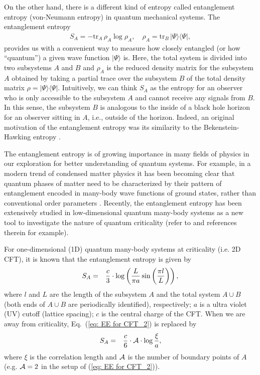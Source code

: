 \documentclass[twocolumn,amsmath,amssymb,nofootinbib,eqsecnum,tighten,prd]{revtex4}
\def\frac#1#2{{#1\over #2}}
\def\f {\frac}
\def\frac#1#2{{#1\over #2}}
\begin{document}
On the other hand, there is a different kind of entropy called
entanglement entropy (von-Neumann entropy) in quantum mechanical
systems. The entanglement entropy
\begin{eqnarray}
S_A = - \mathrm{tr}_{A}\, \rho_{A} \log \rho_{A},\quad
\rho_{A}=\mathrm{tr}_{B}\, |\Psi\rangle \langle \Psi|, \label{eq:
def entanglement entropy}
\end{eqnarray}
provides us with a convenient way to measure how closely entangled
(or how ``quantum'') a given wave function $|\Psi\rangle$ is. Here,
the total system is divided into two subsystems $A$ and $B$ and
$\rho_{A}$ is the reduced density matrix for the subsystem $A$
obtained by taking a partial trace over the subsystem $B$ of the
total density matrix $\rho=|\Psi\rangle \langle \Psi|$. Intuitively,
we can think $S_A$ as the entropy for an observer who is only
accessible to the subsystem $A$ and cannot receive any signals from
$B$. In this sense, the subsystem $B$ is analogous to the inside of
a black hole horizon for an observer sitting in $A$, i.e., outside
of the horizon. Indeed, an original motivation of the entanglement
entropy was its similarity to the Bekenstein-Hawking entropy
\cite{Bombelli,Srednicki}.

The entanglement entropy is of growing importance in many fields of
physics in our exploration for better understanding of quantum
systems. For example, in a modern trend of condensed matter physics
it has been becoming clear that quantum phases of matter need to be
characterized by their pattern of entanglement encoded in many-body
wave functions of ground states, rather than conventional order
parameters \cite{VLRK,Kitaev05, Levin05}. Recently, the entanglement
entropy has been extensively studied in low-dimensional quantum
many-body systems as a new tool to investigate the nature of quantum
criticality (refer to \cite{Calabrese04} and references therein for
example).

For one-dimensional (1D) quantum many-body systems at criticality
(i.e. 2D CFT), it is known that the entanglement entropy is given by
\cite{Holzhey94,Calabrese04}
\begin{eqnarray}
S_A&=&\frac{c}{3}\cdot\log\left(\f{L}{\pi a}\sin\left(\f{\pi
l}{L}\right)\right),
 \label{eq: EE for CFT_2}
\end{eqnarray}
where $l$ and $L$ are the length of the subsystem $A$ and the total
system $A\cup B$ (both ends of $A\cup B$ are periodically
identified), respectively; $a$ is a ultra violet (UV) cutoff
(lattice spacing); $c$ is the central charge of the CFT. When we are
away from criticality, Eq.\ (\ref{eq: EE for CFT_2}) is replaced by
\cite{VLRK,Calabrese04}
\begin{eqnarray}
S_A &=&
\frac{c}{6}\cdot{\cal A}\cdot\log \f{\xi}{a},
\label{eq: EE for massive}
\end{eqnarray}
where $\xi$ is the correlation length and $\cal A$ is the number
of boundary points of $A$
(e.g. ${\cal A}=2$ in the setup of  (\ref{eq: EE for CFT_2})).
\end{document}
